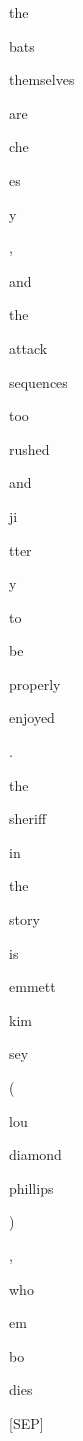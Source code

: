 \documentclass[varwidth=150mm]{standalone}
\begin{document}
\begin{CJK*}{UTF8}{gbsn}
{{{\colorbox{red!1.247008204460144}{\strut the} \colorbox{red!2.947227716445923}{\strut bats} \colorbox{red!0.0}{\strut themselves} \colorbox{red!0.0}{\strut are} \colorbox{red!0.0}{\strut che}\colorbox{red!0.0}{\strut es}\colorbox{red!0.0}{\strut y} \colorbox{red!0.0}{\strut ,} \colorbox{red!1.0554548501968384}{\strut and} \colorbox{red!1.5746852159500122}{\strut the} \colorbox{red!0.0}{\strut attack} \colorbox{red!0.0}{\strut sequences} \colorbox{red!0.0}{\strut too} \colorbox{red!0.0}{\strut rushed} \colorbox{red!0.0}{\strut and} \colorbox{red!0.0}{\strut ji}\colorbox{red!1.2985517978668213}{\strut tter}\colorbox{red!0.0}{\strut y} \colorbox{red!0.0}{\strut to} \colorbox{red!0.0}{\strut be} \colorbox{red!0.0}{\strut properly} \colorbox{red!0.0}{\strut enjoyed} \colorbox{red!0.0}{\strut .} \colorbox{red!1.1524525880813599}{\strut the} \colorbox{red!0.0}{\strut sheriff} \colorbox{red!0.0}{\strut in} \colorbox{red!4.9578375816345215}{\strut the} \colorbox{red!2.0851495265960693}{\strut story} \colorbox{red!1.4165602922439575}{\strut is} \colorbox{red!0.0}{\strut emmett} \colorbox{red!0.0}{\strut kim}\colorbox{red!1.1159868240356445}{\strut sey} \colorbox{red!7.691104888916016}{\strut (} \colorbox{red!1.3982267379760742}{\strut lou} \colorbox{red!0.0}{\strut diamond} \colorbox{red!0.0}{\strut phillips} \colorbox{red!0.0}{\strut )} \colorbox{red!0.0}{\strut ,} \colorbox{red!1.4330531358718872}{\strut who} \colorbox{red!0.0}{\strut em}\colorbox{red!0.0}{\strut bo}\colorbox{red!0.0}{\strut dies} \colorbox{red!4.2349324226379395}{\strut [SEP]}
}}}
\end{CJK*}
\end{document}
